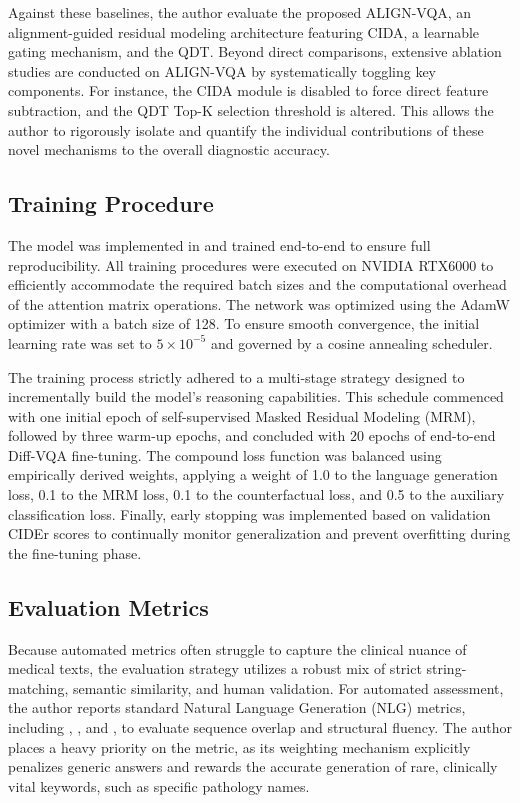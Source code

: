 Against these baselines, the author evaluate the proposed ALIGN-VQA, an alignment-guided residual modeling architecture featuring CIDA, a learnable gating mechanism, and the QDT. Beyond direct comparisons, extensive ablation studies are conducted on ALIGN-VQA by systematically toggling key components. For instance, the CIDA module is disabled to force direct feature subtraction, and the QDT Top-K selection threshold is altered. This allows the author to rigorously isolate and quantify the individual contributions of these novel mechanisms to the overall diagnostic accuracy.

\subsection{Training Procedure}
The model was implemented in \cite{pytorch} and trained end-to-end to ensure full reproducibility. All training procedures were executed on NVIDIA RTX6000 to efficiently accommodate the required batch sizes and the computational overhead of the attention matrix operations. The network was optimized using the AdamW optimizer with a batch size of 128. To ensure smooth convergence, the initial learning rate was set to $5 \times 10^{-5}$ and governed by a cosine annealing scheduler.

The training process strictly adhered to a multi-stage strategy designed to incrementally build the model's reasoning capabilities. This schedule commenced with one initial epoch of self-supervised Masked Residual Modeling (MRM), followed by three warm-up epochs, and concluded with 20 epochs of end-to-end Diff-VQA fine-tuning. The compound loss function was balanced using empirically derived weights, applying a weight of 1.0 to the language generation loss, 0.1 to the MRM loss, 0.1 to the counterfactual loss, and 0.5 to the auxiliary classification loss. Finally, early stopping was implemented based on validation CIDEr scores to continually monitor generalization and prevent overfitting during the fine-tuning phase.

\subsection{Evaluation Metrics}
Because automated metrics often struggle to capture the clinical nuance of medical texts, the evaluation strategy utilizes a robust mix of strict string-matching, semantic similarity, and human validation. For automated assessment, the author reports standard Natural Language Generation (NLG) metrics, including \cite{bleu}, \cite{meteor}, and \cite{rouge}, to evaluate sequence overlap and structural fluency. The author places a heavy priority on the \cite{cider} metric, as its weighting mechanism explicitly penalizes generic answers and rewards the accurate generation of rare, clinically vital keywords, such as specific pathology names.


